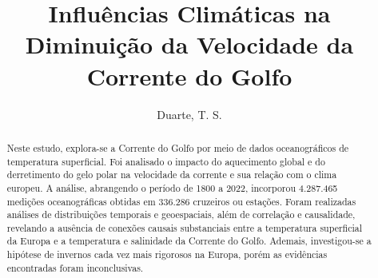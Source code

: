 \documentclass[journal]{IEEEtran}
\begin{document}
    \title{Influências Climáticas na Diminuição da Velocidade da Corrente do Golfo}
    \author{Duarte, T. S.}

    \maketitle

    \begin{abstract}
        Neste estudo, explora-se a Corrente do Golfo por meio de dados oceanográficos de temperatura superficial. Foi analisado o impacto do aquecimento global e do derretimento do gelo polar na velocidade da corrente e sua relação com o clima europeu. A análise, abrangendo o período de 1800 a 2022, incorporou 4.287.465 medições oceanográficas obtidas em 336.286 cruzeiros ou estações. Foram realizadas análises de distribuições temporais e geoespaciais, além de correlação e causalidade, revelando a ausência de conexões causais substanciais entre a temperatura superficial da Europa e a temperatura e salinidade da Corrente do Golfo. Ademais, investigou-se a hipótese de invernos cada vez mais rigorosos na Europa, porém as evidências encontradas foram inconclusivas.
    \end{abstract}
\end{document}
